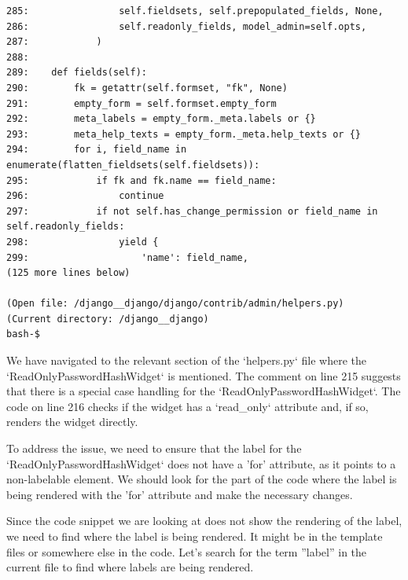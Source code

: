 {\begin{observationbox}
\begin{Verbatim}[breaklines=true, breakanywhere=true]
285:                self.fieldsets, self.prepopulated_fields, None,
286:                self.readonly_fields, model_admin=self.opts,
287:            )
288:
289:    def fields(self):
290:        fk = getattr(self.formset, "fk", None)
291:        empty_form = self.formset.empty_form
292:        meta_labels = empty_form._meta.labels or {}
293:        meta_help_texts = empty_form._meta.help_texts or {}
294:        for i, field_name in enumerate(flatten_fieldsets(self.fieldsets)):
295:            if fk and fk.name == field_name:
296:                continue
297:            if not self.has_change_permission or field_name in self.readonly_fields:
298:                yield {
299:                    'name': field_name,
(125 more lines below)

(Open file: /django__django/django/contrib/admin/helpers.py)
(Current directory: /django__django)
bash-$
\end{Verbatim}
\end{observationbox}
\begin{agentbox}
We have navigated to the relevant section of the `helpers.py` file where the `ReadOnlyPasswordHashWidget` is mentioned. The comment on line 215 suggests that there is a special case handling for the `ReadOnlyPasswordHashWidget`. The code on line 216 checks if the widget has a `read\_only` attribute and, if so, renders the widget directly.



To address the issue, we need to ensure that the label for the `ReadOnlyPasswordHashWidget` does not have a 'for' attribute, as it points to a non-labelable element. We should look for the part of the code where the label is being rendered with the 'for' attribute and make the necessary changes.



Since the code snippet we are looking at does not show the rendering of the label, we need to find where the label is being rendered. It might be in the template files or somewhere else in the code. Let's search for the term ''label'' in the current file to find where labels are being rendered.




\end{agentbox}}
